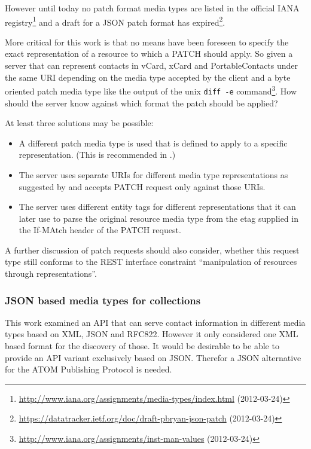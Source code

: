 \documentclass[11pt,a4paper,headsepline,twoside]{scrartcl}		%
\newcommand{\citeurl}[2]{\url{#1} (#2)}
\begin{document}
However until today no patch format media types are listed in the official IANA
registry\footnote{\citeurl{http://www.iana.org/assignments/media-types/index.html}{2012-03-24}}
and a draft for a JSON patch format has
expired\footnote{\citeurl{https://datatracker.ietf.org/doc/draft-pbryan-json-patch}{2012-03-24}}.

More critical for this work is that no means have been foreseen to specify the
exact representation of a resource to which a PATCH should apply. So given a
server that can represent contacts in vCard, xCard and PortableContacts under
the same URI depending on the media type accepted by the client and a byte
oriented patch media type like the output of the unix \lstinline:diff -e:
command\footnote{\citeurl{http://www.iana.org/assignments/inst-man-values}{2012-03-24}}. How
should the server know against which format the patch should be applied?

At least three solutions may be possible:
\begin{itemize}
\item A different patch media type is used that is defined to apply to a specific
  representation. (This is recommended in \cite[ch. 11.9]{Allamaraju_2010}.)
\item The server uses separate URIs for different media type representations as
  suggested by \cite{Raman2006} and accepts PATCH request only against those
  URIs.
\item The server uses different entity tags for different representations that
  it can later use to parse the original resource media type from the etag
  supplied in the If-MAtch header of the PATCH request.
\end{itemize}

A further discussion of patch requests should also consider, whether this
request type still conforms to the REST interface constraint ``manipulation of
resources through representations''\cite[sec. 5.1.5]{Fielding2000}.

\subsubsection{JSON based media types for collections}
\label{sec:media-types-coll}

This work examined an API that can serve contact information in different
media types based on XML, JSON and RFC822. However it only considered one XML
based format for the discovery of those. It would be desirable to be able to
provide an API variant exclusively based on JSON. Therefor a JSON alternative
for the ATOM Publishing Protocol is needed.
\end{document}
